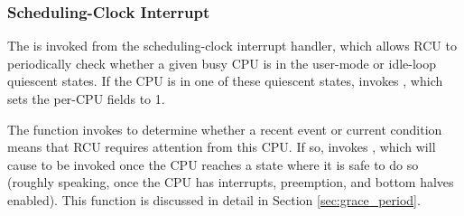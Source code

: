 \subsubsection{Scheduling-Clock Interrupt} \label{sec:timer_interrupt}
The  is invoked from the sched\-ul\-ing-clock interrupt
handler, which allows RCU to periodically check whether a given busy CPU
is in the user-mode or idle-loop quiescent states.
If the CPU is in one of these quiescent states, 
invokes , %
which sets the per-CPU  %
fields to 1. %

%
The  function invokes 
to determine whether a recent event or current condition means that
RCU requires attention from this CPU.
If so,  invokes , %
which will cause  to be invoked once the CPU 
reaches a state where it is safe to do so (roughly speaking, once the CPU 
has interrupts, preemption, and bottom halves enabled). This function is 
discussed in detail in Section \ref{sec:grace_period}.


